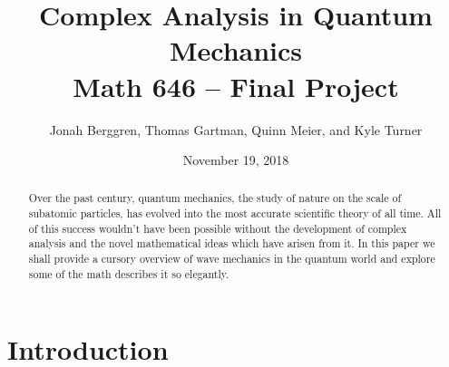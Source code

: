 \documentclass[12pt]{article}
\begin{document}
\title{Complex Analysis in Quantum Mechanics \\
Math 646 -- Final Project}
\author{Jonah Berggren, Thomas Gartman, Quinn Meier, and Kyle Turner}
\date{November 19, 2018}

\maketitle%

\begin{abstract}
Over the past century, quantum mechanics, the study of nature on the scale of subatomic particles, has evolved into the most accurate scientific theory of all time. All of this success wouldn't have been possible without the development of complex analysis and the novel mathematical ideas which have arisen from it. In this paper we shall provide a cursory overview of wave mechanics in the quantum world and explore some of the math describes it so elegantly. 
\end{abstract}


\section{Introduction}%
\end{document}

